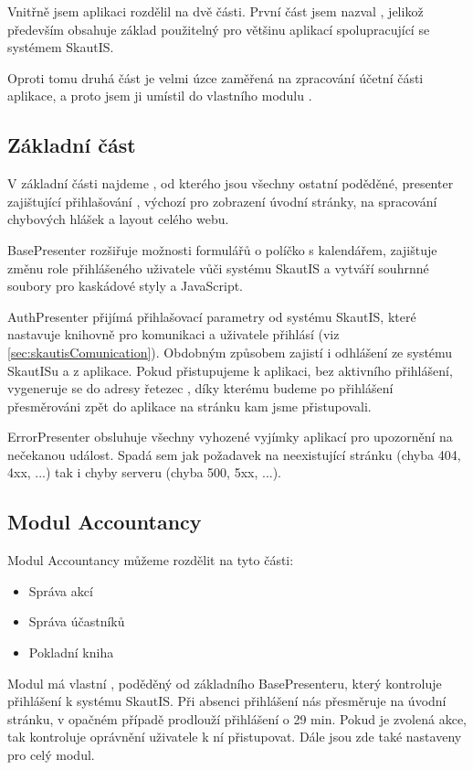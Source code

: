 \documentclass[thesis=B,czech]{FITthesis}[2011/06/14]
\begin{document}
Vnitřně jsem aplikaci rozdělil na dvě části. První část jsem nazval , jelikož především obsahuje základ použitelný pro většinu aplikací spolupracující se systémem SkautIS.

Oproti tomu druhá část je velmi úzce zaměřená na zpracování účetní části aplikace, a proto jsem ji umístil do vlastního modulu .

\subsection{Základní část}
V základní části najdeme , od kterého jsou všechny ostatní poděděné, presenter zajištující přihlašování , výchozí  pro zobrazení úvodní stránky,  na spracování chybových hlášek a layout celého webu.

BasePresenter rozšiřuje možnosti formulářů o políčko s kalendářem, zajištuje změnu role přihlášeného uživatele vůči systému SkautIS a vytváří souhrnné soubory pro kaskádové styly a JavaScript.

AuthPresenter přijímá přihlašovací parametry od systému SkautIS, které nastavuje knihovně pro komunikaci a uživatele přihlásí (viz \ref{sec:skautisComunication}). Obdobným způsobem zajistí i odhlášení ze systému SkautISu a z aplikace. Pokud přistupujeme k aplikaci, bez aktivního přihlášení, vygeneruje se do adresy řetezec , díky kterému budeme po přihlášení přesměrováni zpět do aplikace na stránku kam jsme přistupovali.

ErrorPresenter obsluhuje všechny vyhozené vyjímky aplikací pro upozornění na nečekanou událost. Spadá sem jak požadavek na neexistující stránku (chyba 404, 4xx, ...) tak i chyby serveru (chyba 500, 5xx, ...).

\subsection{Modul Accountancy}

Modul Accountancy můžeme rozdělit na tyto části:
\begin{itemize}
	\item Správa akcí
	\item Správa účastníků
	\item Pokladní kniha
\end{itemize}

Modul má vlastní , poděděný od základního BasePresenteru, který kontroluje přihlášení k systému SkautIS. Při absenci přihlášení nás přesměruje na úvodní stránku, v opačném případě prodlouží přihlášení o 29 min. Pokud je zvolená akce, tak kontroluje oprávnění uživatele k ní přistupovat. Dále jsou zde také nastaveny  pro celý modul.
\end{document}
